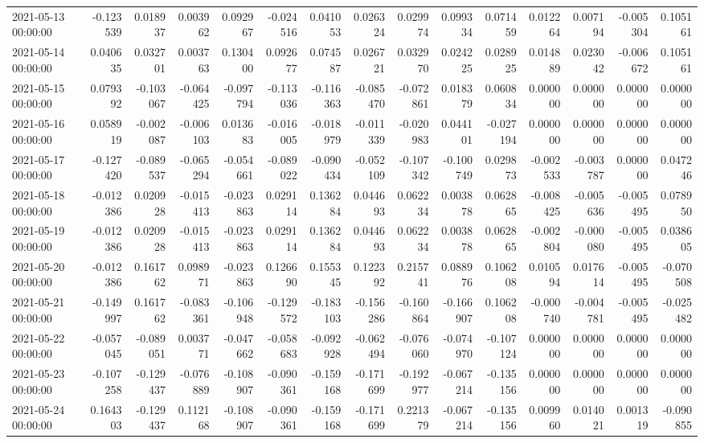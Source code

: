 \begin{tabular}{lrrrrrrrrrrrrrr}
2021-05-13 00:00:00 & -0.123539 & 0.018937 & 0.003962 & 0.092967 & -0.024516 & 0.041053 & 0.026324 & 0.029974 & 0.099334 & 0.071459 & 0.012264 & 0.007194 & -0.005304 & 0.105161 \\
2021-05-14 00:00:00 & 0.040635 & 0.032701 & 0.003763 & 0.130400 & 0.092677 & 0.074587 & 0.026721 & 0.032970 & 0.024225 & 0.028925 & 0.014889 & 0.023042 & -0.006672 & 0.105161 \\
2021-05-15 00:00:00 & 0.079392 & -0.103067 & -0.064425 & -0.097794 & -0.113036 & -0.116363 & -0.085470 & -0.072861 & 0.018379 & 0.060834 & 0.000000 & 0.000000 & 0.000000 & 0.000000 \\
2021-05-16 00:00:00 & 0.058919 & -0.002087 & -0.006103 & 0.013683 & -0.016005 & -0.018979 & -0.011339 & -0.020983 & 0.044101 & -0.027194 & 0.000000 & 0.000000 & 0.000000 & 0.000000 \\
2021-05-17 00:00:00 & -0.127420 & -0.089537 & -0.065294 & -0.054661 & -0.089022 & -0.090434 & -0.052109 & -0.107342 & -0.100749 & 0.029873 & -0.002533 & -0.003787 & 0.000000 & 0.047246 \\
2021-05-18 00:00:00 & -0.012386 & 0.020928 & -0.015413 & -0.023863 & 0.029114 & 0.136284 & 0.044693 & 0.062234 & 0.003878 & 0.062865 & -0.008425 & -0.005636 & -0.005495 & 0.078950 \\
2021-05-19 00:00:00 & -0.012386 & 0.020928 & -0.015413 & -0.023863 & 0.029114 & 0.136284 & 0.044693 & 0.062234 & 0.003878 & 0.062865 & -0.002804 & -0.000080 & -0.005495 & 0.038605 \\
2021-05-20 00:00:00 & -0.012386 & 0.161762 & 0.098971 & -0.023863 & 0.126690 & 0.155345 & 0.122392 & 0.215741 & 0.088976 & 0.106208 & 0.010594 & 0.017614 & -0.005495 & -0.070508 \\
2021-05-21 00:00:00 & -0.149997 & 0.161762 & -0.083361 & -0.106948 & -0.129572 & -0.183103 & -0.156286 & -0.160864 & -0.166907 & 0.106208 & -0.000740 & -0.004781 & -0.005495 & -0.025482 \\
2021-05-22 00:00:00 & -0.057045 & -0.089051 & 0.003771 & -0.047662 & -0.058683 & -0.092928 & -0.062494 & -0.076060 & -0.074970 & -0.107124 & 0.000000 & 0.000000 & 0.000000 & 0.000000 \\
2021-05-23 00:00:00 & -0.107258 & -0.129437 & -0.076889 & -0.108907 & -0.090361 & -0.159168 & -0.171699 & -0.192977 & -0.067214 & -0.135156 & 0.000000 & 0.000000 & 0.000000 & 0.000000 \\
2021-05-24 00:00:00 & 0.164303 & -0.129437 & 0.112168 & -0.108907 & -0.090361 & -0.159168 & -0.171699 & 0.221379 & -0.067214 & -0.135156 & 0.009960 & 0.014021 & 0.001319 & -0.090855 \\

\end{tabular}
